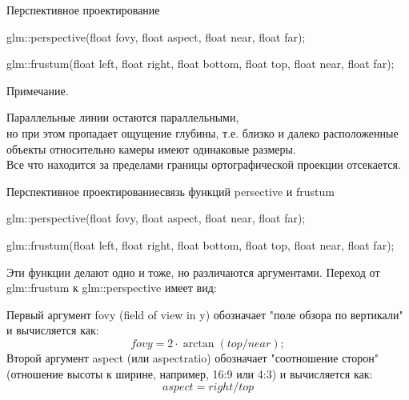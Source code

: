 \documentclass{beamer}
\begin{document}
	\begin{frame}{Перспективное проектирование}

		glm::perspective(float fovy, float aspect, float near, float far);
		
		glm::frustum(float left, float right, float bottom, float top, float near, float far);

		Примечание.

		Параллельные линии остаются параллельными,
		\\ но при этом пропадает ощущение глубины, т.е. близко и далеко расположенные объекты относительно камеры имеют одинаковые размеры.
		\\ Все что находится за пределами границы ортографической проекции отсекается.
	\end{frame}

	\begin{frame}{Перспективное проектирование}{связь функций persective и frustum}

		
		glm::perspective(float fovy, float aspect, float near, float far);
		
		glm::frustum(float left, float right, float bottom, float top, float near, float far);
		
		Эти функции делают одно и тоже, но различаются аргументами.
		Переход от glm::frustum к glm::perspective имеет вид:

		Первый аргумент fovy  (field of view in y) обозначает "поле обзора по вертикали" и вычисляется как:
		\[
			fovy = 2 \cdot \arctan (top / near);
		\]
		Второй аргумент aspect (или aspectratio) обозначает "соотношение сторон" (отношение высоты к ширине, например, 16:9 или 4:3) и вычисляется как:
		\[
			aspect =  right / top
		\]
		

	\end{frame}
\end{document}
